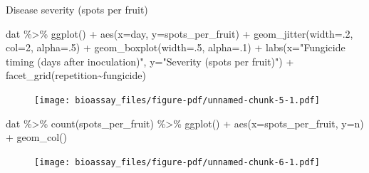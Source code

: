 \documentclass[
  letterpaper,
  DIV=11,
  numbers=noendperiod]{scrreport}
\newenvironment{Shaded}{\begin{snugshade}}{\end{snugshade}}
\newcommand{\AttributeTok}[1]{\textcolor[rgb]{0.40,0.45,0.13}{#1}}
\newcommand{\DecValTok}[1]{\textcolor[rgb]{0.68,0.00,0.00}{#1}}
\newcommand{\FunctionTok}[1]{\textcolor[rgb]{0.28,0.35,0.67}{#1}}
\newcommand{\NormalTok}[1]{\textcolor[rgb]{0.00,0.23,0.31}{#1}}
\newcommand{\SpecialCharTok}[1]{\textcolor[rgb]{0.37,0.37,0.37}{#1}}
\newcommand{\StringTok}[1]{\textcolor[rgb]{0.13,0.47,0.30}{#1}}
\begin{document}
Disease severity (spots per fruit)

\begin{Shaded}
\begin{Highlighting}[]
\NormalTok{dat }\SpecialCharTok{\%\textgreater{}\%} 
  \FunctionTok{ggplot}\NormalTok{() }\SpecialCharTok{+} 
  \FunctionTok{aes}\NormalTok{(}\AttributeTok{x=}\NormalTok{day, }\AttributeTok{y=}\NormalTok{spots\_per\_fruit) }\SpecialCharTok{+} 
  \FunctionTok{geom\_jitter}\NormalTok{(}\AttributeTok{width=}\NormalTok{.}\DecValTok{2}\NormalTok{, }\AttributeTok{col=}\DecValTok{2}\NormalTok{, }\AttributeTok{alpha=}\NormalTok{.}\DecValTok{5}\NormalTok{) }\SpecialCharTok{+} 
  \FunctionTok{geom\_boxplot}\NormalTok{(}\AttributeTok{width=}\NormalTok{.}\DecValTok{5}\NormalTok{, }\AttributeTok{alpha=}\NormalTok{.}\DecValTok{1}\NormalTok{) }\SpecialCharTok{+} 
  \FunctionTok{labs}\NormalTok{(}\AttributeTok{x=}\StringTok{"Fungicide timing (days after inoculation)"}\NormalTok{, }
       \AttributeTok{y=}\StringTok{"Severity (spots per fruit)"}\NormalTok{) }\SpecialCharTok{+} 
  \FunctionTok{facet\_grid}\NormalTok{(repetition}\SpecialCharTok{\textasciitilde{}}\NormalTok{fungicide)}
\end{Highlighting}
\end{Shaded}

\begin{figure}[H]

{\centering \texttt{[image: bioassay\_files/figure-pdf/unnamed-chunk-5-1.pdf]}

}

\end{figure}

\begin{Shaded}
\begin{Highlighting}[]
\NormalTok{dat }\SpecialCharTok{\%\textgreater{}\%} 
  \FunctionTok{count}\NormalTok{(spots\_per\_fruit) }\SpecialCharTok{\%\textgreater{}\%} 
  \FunctionTok{ggplot}\NormalTok{() }\SpecialCharTok{+} 
  \FunctionTok{aes}\NormalTok{(}\AttributeTok{x=}\NormalTok{spots\_per\_fruit, }\AttributeTok{y=}\NormalTok{n) }\SpecialCharTok{+} 
  \FunctionTok{geom\_col}\NormalTok{()}
\end{Highlighting}
\end{Shaded}

\begin{figure}[H]

{\centering \texttt{[image: bioassay\_files/figure-pdf/unnamed-chunk-6-1.pdf]}

}

\end{figure}
\end{document}

